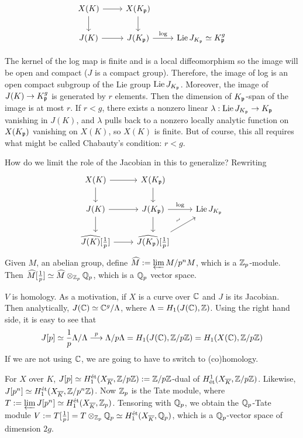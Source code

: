 
	\[
	\begin{tikzcd}
	X(K) \arrow{r} \arrow{d} &  X(K_\p) \arrow{d} \\
	J(K) \arrow{r} & J(K_\p) \arrow{r}{\log} & \lie J_{K_\p} \simeq K_\p^g
	\end{tikzcd}
	\]

The kernel of the log map is finite and is a local diffeomorphism so the image will be open and compact ($J$ is a compact group). Therefore, the image of log is an open compact subgroup of the Lie group $\operatorname{Lie} J_{K_{\mathfrak{p}}}$. Moreover, the image of $J(K) \to K_{\mathfrak{p}}^g$ is generated by $r$ elements. Then the dimension of $K_{\mathfrak{p}}$-span of the image is at most $r$. If $r< g$, there exists a nonzero linear $\lambda: \operatorname{Lie} J_{K_{\mathfrak{p}}} \to K_{\mathfrak{p}}$ vanishing in $J(K)$, and $\lambda$ pulls back to a nonzero locally analytic function on $X(K_{\mathfrak{p}})$ vanishing on $X(K)$, so $X(K)$ is finite. But of course, this all requires what might be called Chabauty's condition: $r<g$. 


How do we limit the role of the Jacobian in this to generalize? Rewriting
	\[
	\begin{tikzcd}
	X(K) \arrow{d} \arrow{r} & X(K_\p) \arrow{d} \\
	J(K) \arrow{r} \arrow{d} & J(K_\p) \arrow{r}{\log} \arrow{d} & \lie J_{K_\p} \\
	\widehat{J(K)}[\frac{1}{p}] \arrow{r} & \widehat{J(K_\p)}[\frac{1}{p}] \arrow{ur}{\rotatebox{45}{$\sim$}} 
	\end{tikzcd}
	\]
Given $M$, an abelian group, define $\widehat{M}:= \varprojlim M/p^nM$, which is a $\mathbb{Z}_p$-module. Then $\widehat{M}[\frac{1}{p}] \simeq \widehat{M} \otimes_{\mathbb{Z}_p} \mathbb{Q}_p$, which is a $\mathbb{Q}_p$ vector space. 


$V$ is \etale homology. As a motivation, if $X$ is a curve over $\mathbb{C}$ and $J$ is its Jacobian. Then analytically, $J(\mathbb{C}) \simeq \mathbb{C}^g/ \Lambda$, where $\Lambda= H_1(J(\mathbb{C}),\mathbb{Z})$. Using the right hand side, it is easy to see that 
	\[
	J[p] \simeq \frac{1}{p} \Lambda/\Lambda \stackrel{p}{\longrightarrow} \Lambda/p\Lambda= H_1(J(\mathbb{C}), \mathbb{Z}/p\mathbb{Z})= H_1(X(\mathbb{C}),\mathbb{Z}/p\mathbb{Z}) 
	\]
If we are not using $\mathbb{C}$, we are going to have to switch to \Etale (co)homology.


For $X$ over $K$, $J[p] \simeq H_1^{\text{\'et}}(X_{\overline{K}}, \mathbb{Z}/p\mathbb{Z}):= \mathbb{Z}/p\mathbb{Z}$-dual of $H^1_{\text{\'et}}(X_{\overline{K}}, \mathbb{Z}/p\mathbb{Z})$. Likewise, $J[p^n] \simeq H_1^{\text{\'et}}(X_{\overline{K}}, \mathbb{Z}/p^n\mathbb{Z})$. Now $\mathbb{Z}_p$ is the Tate module, where $T:= \varprojlim J[p^n] \simeq H_1^{\text{\'et}}(X_{\overline{K}}, \mathbb{Z}_p)$. Tensoring with $\mathbb{Q}_p$, we obtain the $\mathbb{Q}_p$-Tate module $V:= T[\frac{1}{p}]= T \otimes_{\mathbb{Z}_p} \mathbb{Q}_p \simeq H_1^{\text{\'et}}(X_{\overline{K}}, \mathbb{Q}_p)$, which is a $\mathbb{Q}_p$-vector space of dimension $2g$. 


